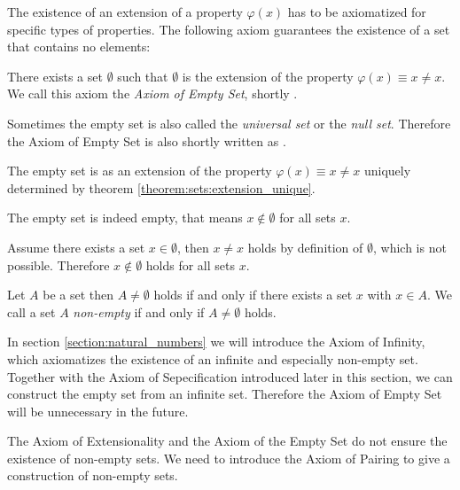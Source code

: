 The existence of an extension of a property $\varphi(x)$ has to be axiomatized for specific types of properties. The following axiom guarantees the existence of a set that contains no elements:

\begin{axiom}
    There exists a set $\emptyset$ such that $\emptyset$ is the extension of the property $\varphi(x)\equiv x\neq x$. We call this axiom the \emph{Axiom of Empty Set}, shortly .
\end{axiom}

\begin{remarks}
    \begin{remarkenumerate}
        \item Sometimes the empty set is also called the \emph{universal set} or the \emph{null set}. Therefore the Axiom of Empty Set is also shortly written as .
        \item The empty set is as an extension of the property $\varphi(x)\equiv x\neq x$ uniquely determined by theorem \ref{theorem:sets:extension_unique}.
        \item The empty set is indeed empty, that means $x\notin\emptyset$ for all sets $x$.
        \begin{miniproof}
            Assume there exists a set $x\in\emptyset$, then $x\neq x$ holds by definition of $\emptyset$, which is not possible. Therefore $x\notin\emptyset$ holds for all sets $x$.
        \end{miniproof}
        \item\label{remark:sets:non_empty_sets} Let $A$ be a set then $A\neq\emptyset$ holds if and only if there exists a set $x$ with $x\in A$. We call a set $A$ \emph{non-empty} if and only if $A\neq\emptyset$ holds.
    \end{remarkenumerate}
\end{remarks}

In section \ref{section:natural_numbers} we will introduce the Axiom of Infinity, which axiomatizes the existence of an infinite and especially non-empty set. Together with the Axiom of Sepecification introduced later in this section, we can construct the empty set from an infinite set. Therefore the Axiom of Empty Set will be unnecessary in the future.

The Axiom of Extensionality and the Axiom of the Empty Set do not ensure the existence of non-empty sets. We need to introduce the Axiom of Pairing to give a construction of non-empty sets.

